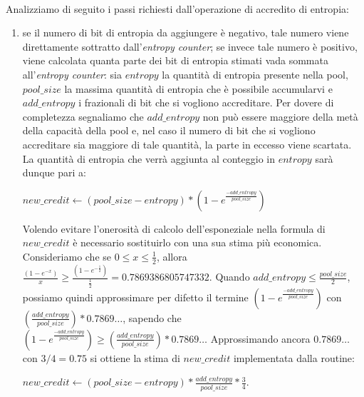 \documentclass{article}
\begin{document}
 \paragraph{}Analizziamo di seguito i passi richiesti dall'operazione di
 accredito di entropia:
 \begin{enumerate}
   \item se il numero di bit di entropia da aggiungere è negativo, tale numero
   viene direttamente sottratto dall'\emph{entropy counter};
   \newline se invece tale numero è positivo, viene calcolata quanta parte dei
   bit di entropia stimati vada sommata all'\emph{entropy counter}: sia
   $entropy$ la quantità di entropia presente nella pool, $pool\_size$ la
   massima quantità di entropia che è possibile accumularvi e $add\_entropy$ i
   frazionali di bit che si vogliono accreditare.
   Per dovere di completezza segnaliamo che $add\_entropy$ non può essere
   maggiore della metà della capacità della pool e, nel caso il numero di bit
   che si vogliono accreditare sia maggiore di tale quantità, la parte
   in eccesso viene scartata.
   \newline La quantità di
   entropia che verrà aggiunta al conteggio in $entropy$ sarà dunque pari a:
   \begin{center}
   $new\_credit\leftarrow(pool\_size -
   entropy)*(1-e^{\frac{-add\_entropy}{pool\_size}})$
   \end{center}
   Volendo evitare l'onerosità di calcolo dell'esponeziale nella formula di
   $new\_credit$ è necessario sostituirlo con una sua stima più economica.
   \newline Consideriamo che se $0\leq x\leq\frac{1}{2}$, allora
   $\frac{(1-e^{-x})}{x}\geq
   \frac{(1-e^{-\frac{1}{2}})}{\frac{1}{2}} = 0.7869386805747332$.
   \newline Quando $add\_entropy\leq\frac{pool\_size}{2}$, possiamo
   quindi approssimare per difetto il termine
   $(1-e^{\frac{-add\_entropy}{pool\_size}})$ con $(\frac{add\_entropy}
   {pool\_size})*0.7869\ldots$, sapendo che
   $(1-e^{\frac{-add\_entropy}{pool\_size}})\geq(\frac{add\_entropy}
   {pool\_size})*0.7869\ldots$ 
   \newline Approssimando ancora $0.7869\ldots$ con $3/4=0.75$ si ottiene la
   stima di $new\_credit$ implementata dalla routine:
   \begin{center}
   $new\_credit\leftarrow(pool\_size -
   entropy)*\frac{add\_entropy}
   {pool\_size}*\frac{3}{4}$.
   \end{center}

\end{enumerate}
\end{document}
